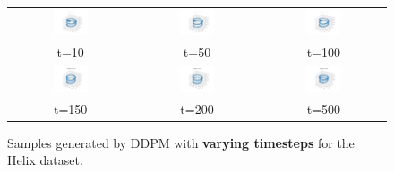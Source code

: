 \documentclass[11pt]{article}
\begin{document}
\begin{figure}[H]
    \centering
    \begin{tabular}{ccc}
        \includegraphics[width=0.3\textwidth]{exps/ddpm_3_10_0.0001_0.02_helix/samples_10.png} &
        \includegraphics[width=0.3\textwidth]{exps/ddpm_3_50_0.0001_0.02_helix/samples_50.png} &
        \includegraphics[width=0.3\textwidth]{exps/ddpm_3_100_0.0001_0.02_helix/samples_100.png} \\
        t=10 & t=50 & t=100 \\[0.5em]
        
        \includegraphics[width=0.3\textwidth]{exps/ddpm_3_150_0.0001_0.02_helix/samples_150.png} &
        \includegraphics[width=0.3\textwidth]{exps/ddpm_3_200_0.0001_0.02_helix/samples_200.png} &
        \includegraphics[width=0.3\textwidth]{exps/ddpm_3_500_0.0001_0.02_helix/samples_500.png} \\
        t=150 & t=200 & t=500 \\
    \end{tabular}
    \caption{Samples generated by DDPM with \textbf{varying timesteps} for the Helix dataset.}
    \label{fig:timesteps_helix}
\end{figure}
\end{document}
